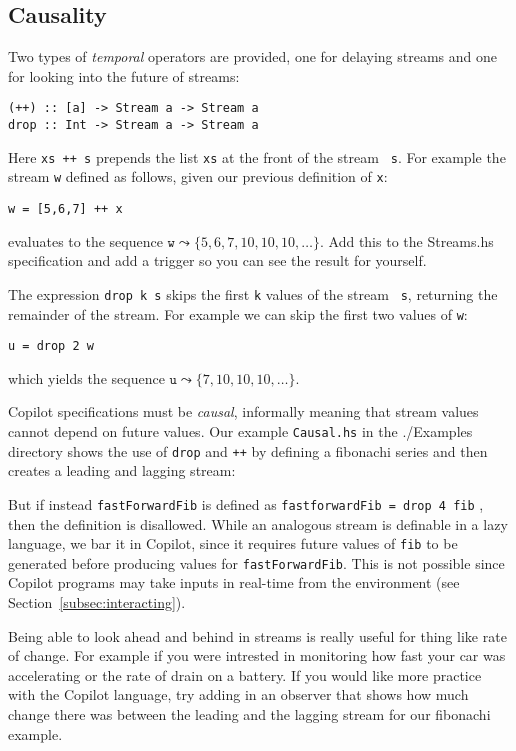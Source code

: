 \subsection{Causality} 
Two types of \emph{temporal} operators are provided, one for delaying streams and one for
looking into the future of streams:
%
\begin{lstlisting}[language = Copilot, frame = single]
(++) :: [a] -> Stream a -> Stream a
drop :: Int -> Stream a -> Stream a
\end{lstlisting}
%
Here {\tt xs ++ s} prepends the list {\tt xs} at the front of the stream {\tt
s}.
%
For example the stream {\tt w} defined as follows, given our previous
definition of {\tt x}:
%
\begin{lstlisting}[language = Copilot, frame = single] w = [5,6,7] ++ x
\end{lstlisting}
%
evaluates to the sequence $\mathtt{w} \leadsto \{5, 6, 7, 10, 10, 10, \dots\}$.
%
Add this to the Streams.hs specification and add a trigger so you can see the
result for yourself.

The expression {\tt drop k s} skips the first {\tt k} values of the stream {\tt
s}, returning the remainder of the stream.
%
For example we can skip the first two values of {\tt w}:
%
\begin{lstlisting}[language = Copilot, frame = single] u = drop 2 w
\end{lstlisting}
%
which yields the sequence $\mathtt{u} \leadsto \{7, 10, 10, 10, \dots\}$.

Copilot specifications must be \emph{causal}, informally meaning that stream
values cannot depend on future values.
%
Our example \texttt{Causal.hs} in the ./Examples directory shows the use of
{\tt drop} and {\tt ++} by defining a fibonachi series and then creates a
leading and lagging stream:
%

%

But if instead {\tt fastForwardFib} is defined as {\tt fastforwardFib = drop 4
fib} , then the definition is disallowed.
%
While an analogous stream is definable in a lazy language, we bar it in
Copilot, since it requires future values of {\tt fib} to be generated before
producing values for {\tt fastForwardFib}.
%
This is not possible since Copilot programs may take inputs in real-time from
the environment (see Section~\ref{subsec:interacting}).

Being able to look ahead and behind in streams is really useful for thing like
rate of change.
%
For example if you were intrested in monitoring how fast your car was
accelerating or the rate of drain on a battery.
%
If you would like more practice with the Copilot language, try adding in an
observer that shows how much change there was between the leading and the
lagging stream for our fibonachi example.

